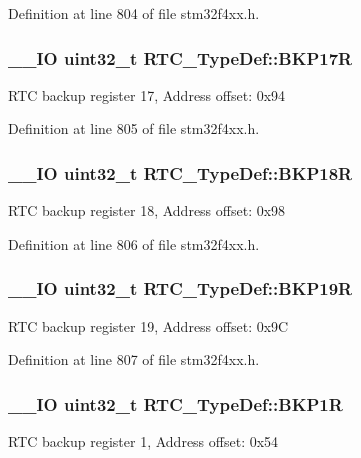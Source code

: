 Definition at line 804 of file stm32f4xx.\-h.

\hypertarget{struct_r_t_c___type_def_a90a305a8e00b357f28daef5041e5a8b1}{
\subsubsection[{B\-K\-P17\-R}]{\setlength{\rightskip}{0pt plus 5cm}\-\_\-\-\_\-\-I\-O {\bf uint32\-\_\-t} R\-T\-C\-\_\-\-Type\-Def\-::\-B\-K\-P17\-R}}\label{struct_r_t_c___type_def_a90a305a8e00b357f28daef5041e5a8b1}
R\-T\-C backup register 17, Address offset\-: 0x94 

Definition at line 805 of file stm32f4xx.\-h.

\hypertarget{struct_r_t_c___type_def_a171288f82cab2623832de779fb435d74}{
\subsubsection[{B\-K\-P18\-R}]{\setlength{\rightskip}{0pt plus 5cm}\-\_\-\-\_\-\-I\-O {\bf uint32\-\_\-t} R\-T\-C\-\_\-\-Type\-Def\-::\-B\-K\-P18\-R}}\label{struct_r_t_c___type_def_a171288f82cab2623832de779fb435d74}
R\-T\-C backup register 18, Address offset\-: 0x98 

Definition at line 806 of file stm32f4xx.\-h.

\hypertarget{struct_r_t_c___type_def_a993f54e8feff9254f795dfd3e000fc55}{
\subsubsection[{B\-K\-P19\-R}]{\setlength{\rightskip}{0pt plus 5cm}\-\_\-\-\_\-\-I\-O {\bf uint32\-\_\-t} R\-T\-C\-\_\-\-Type\-Def\-::\-B\-K\-P19\-R}}\label{struct_r_t_c___type_def_a993f54e8feff9254f795dfd3e000fc55}
R\-T\-C backup register 19, Address offset\-: 0x9\-C 

Definition at line 807 of file stm32f4xx.\-h.

\hypertarget{struct_r_t_c___type_def_a5439bfca3708c6b8be6a74626f06111f}{
\subsubsection[{B\-K\-P1\-R}]{\setlength{\rightskip}{0pt plus 5cm}\-\_\-\-\_\-\-I\-O {\bf uint32\-\_\-t} R\-T\-C\-\_\-\-Type\-Def\-::\-B\-K\-P1\-R}}\label{struct_r_t_c___type_def_a5439bfca3708c6b8be6a74626f06111f}
R\-T\-C backup register 1, Address offset\-: 0x54 

